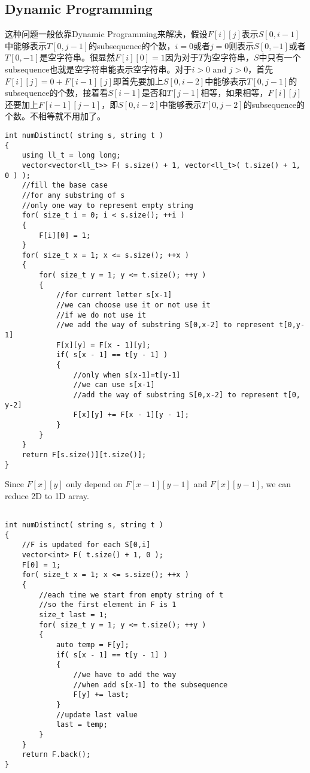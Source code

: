 \subsection{Dynamic Programming}
这种问题一般依靠Dynamic Programming来解决，假设$F[i][j]$表示$S[0,i-1]$中能够表示$T[0,j-1]$的subsequence的个数，$i=0$或者$j=0$则表示$S[0,-1]$或者$T[0,-1]$是空字符串。很显然$F[i][0]=1$因为对于$T$为空字符串，$S$中只有一个subsequence也就是空字符串能表示空字符串。对于$i>0$ and $j>0$，首先$F[i][j] = 0 + F[i-1][j]$即首先要加上$S[0,i-2]$中能够表示$T[0,j-1]$的subsequence的个数，接着看$S[i-1]$是否和$T[j-1]$相等，如果相等，$F[i][j]$还要加上$F[i-1][j-1]$，即$S[0,i-2]$中能够表示$T[0,j-2]$的subsequence的个数。不相等就不用加了。

\setcounter{lstlisting}{0}
\begin{lstlisting}[style=customc, caption={DP With 2D Array}]
int numDistinct( string s, string t )
{
    using ll_t = long long;
    vector<vector<ll_t>> F( s.size() + 1, vector<ll_t>( t.size() + 1, 0 ) );
    //fill the base case
    //for any substring of s
    //only one way to represent empty string
    for( size_t i = 0; i < s.size(); ++i )
    {
        F[i][0] = 1;
    }
    for( size_t x = 1; x <= s.size(); ++x )
    {
        for( size_t y = 1; y <= t.size(); ++y )
        {
            //for current letter s[x-1]
            //we can choose use it or not use it
            //if we do not use it
            //we add the way of substring S[0,x-2] to represent t[0,y-1]
            F[x][y] = F[x - 1][y];
            if( s[x - 1] == t[y - 1] )
            {
                //only when s[x-1]=t[y-1]
                //we can use s[x-1]
                //add the way of substring S[0,x-2] to represent t[0, y-2]
                F[x][y] += F[x - 1][y - 1];
            }
        }
    }
    return F[s.size()][t.size()];
}
\end{lstlisting}

Since $F[x][y]$ only depend on $F[x-1][y-1]$ and $F[x][y-1]$, we can reduce 2D to 1D array.

\begin{lstlisting}[style=customc, caption={DP With 1D Array}]

int numDistinct( string s, string t )
{
    //F is updated for each S[0,i]
    vector<int> F( t.size() + 1, 0 );
    F[0] = 1;
    for( size_t x = 1; x <= s.size(); ++x )
    {
        //each time we start from empty string of t
        //so the first element in F is 1
        size_t last = 1;
        for( size_t y = 1; y <= t.size(); ++y )
        {
            auto temp = F[y];
            if( s[x - 1] == t[y - 1] )
            {
                //we have to add the way
                //when add s[x-1] to the subsequence
                F[y] += last;
            }
            //update last value
            last = temp;
        }
    }
    return F.back();
}
\end{lstlisting}

